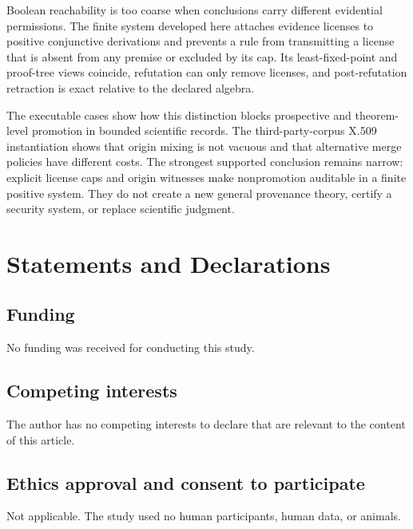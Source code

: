 \documentclass[pdflatex,sn-mathphys-num]{sn-jnl}
\begin{document}
Boolean reachability is too coarse when conclusions carry different evidential permissions. The finite system developed here attaches evidence licenses to positive conjunctive derivations and prevents a rule from transmitting a license that is absent from any premise or excluded by its cap. Its least-fixed-point and proof-tree views coincide, refutation can only remove licenses, and post-refutation retraction is exact relative to the declared algebra.

The executable cases show how this distinction blocks prospective and theorem-level promotion in bounded scientific records. The third-party-corpus X.509 instantiation shows that origin mixing is not vacuous and that alternative merge policies have different costs. The strongest supported conclusion remains narrow: explicit license caps and origin witnesses make nonpromotion auditable in a finite positive system. They do not create a new general provenance theory, certify a security system, or replace scientific judgment.

\backmatter

\section*{Statements and Declarations}\label{statements-and-declarations}

\subsection{Funding}\label{funding}

No funding was received for conducting this study.

\subsection{Competing interests}\label{competing-interests}

The author has no competing interests to declare that are relevant to the content of this article.

\subsection{Ethics approval and consent to participate}\label{ethics-approval-and-consent-to-participate}

Not applicable. The study used no human participants, human data, or animals.
\end{document}
